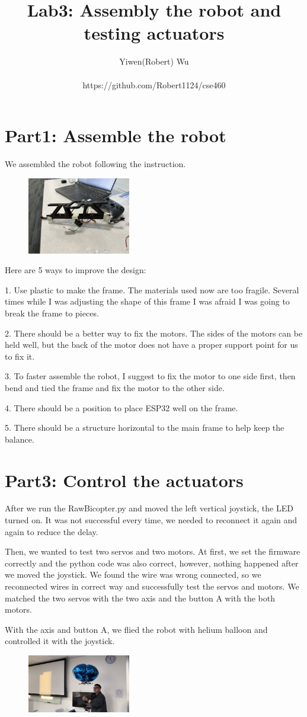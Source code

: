 \documentclass[letterpaper, 10 pt, conference]{ieeeconf}  %
\title{\LARGE \bf
Lab3: Assembly the robot and testing actuators
}
\author{Yiwen(Robert) Wu\\\\https://github.com/Robert1124/cse460}
\begin{document}
\maketitle
\thispagestyle{empty}
\pagestyle{empty}

\section{Part1: Assemble the robot}
We assembled the robot following the instruction.

\begin{figure}[htbp]
    \centering
    \includegraphics[width=0.4\textwidth]{image1.jpg}
\end{figure}

Here are 5 ways to improve the design:

1. Use plastic to make the frame. The materials used now are too fragile. Several times while I was adjusting the shape of this frame I was afraid I was going to break the frame to pieces.

2. There should be a better way to fix the motors. The sides of the motors can be held well, but the back of the motor does not have a proper support point for us to fix it.

3. To faster assemble the robot, I suggest to fix the motor to one side first, then bend and tied the frame and fix the motor to the other side.

4. There should be a position to place ESP32 well on the frame.

5. There should be a structure horizontal to the main frame to help keep the balance.
\newpage
\section{Part3: Control the actuators}

After we run the RawBicopter.py and moved the left vertical joystick, the LED turned on. It was not successful every time, we needed to reconnect it again and again to reduce the delay.

Then, we wanted to test two servos and two motors. At first, we set the firmware correctly and the python code was also correct, however, nothing happened after we moved the joystick. We found the wire was wrong connected, so we reconnected wires in correct way and successfully test the servos and motors. We matched the two servos with the two axis and the button A with the both motors.

With the axis and button A, we flied the robot with helium balloon and controlled it with the joystick.

\begin{figure}[htbp]
    \centering
    \includegraphics[width=0.4\textwidth]{image2.jpg}
\end{figure}
\end{document}
